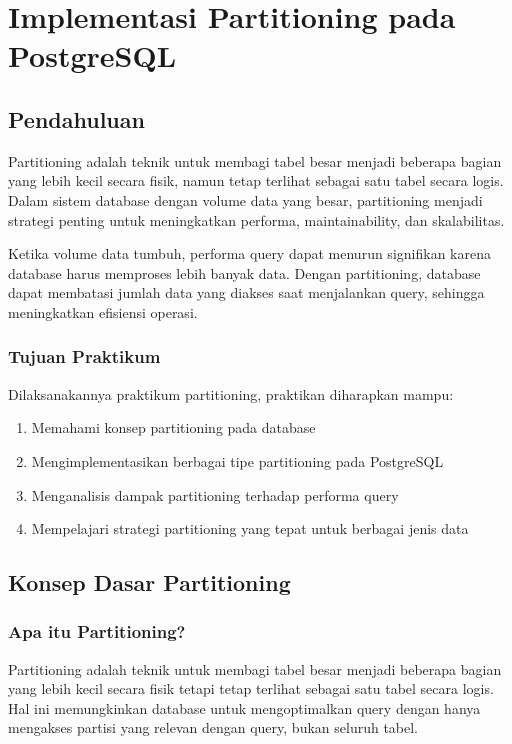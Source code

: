 \chapter{Implementasi Partitioning pada PostgreSQL}
\setcounter{section}{0}
\section{Pendahuluan}
Partitioning adalah teknik untuk membagi tabel besar menjadi beberapa bagian yang lebih kecil secara fisik, namun tetap terlihat sebagai satu tabel secara logis. Dalam sistem database dengan volume data yang besar, partitioning menjadi strategi penting untuk meningkatkan performa, maintainability, dan skalabilitas.

Ketika volume data tumbuh, performa query dapat menurun signifikan karena database harus memproses lebih banyak data. Dengan partitioning, database dapat membatasi jumlah data yang diakses saat menjalankan query, sehingga meningkatkan efisiensi operasi.

\subsection{Tujuan Praktikum}
Dilaksanakannya praktikum partitioning, praktikan diharapkan mampu:
\begin{enumerate}
    \item Memahami konsep partitioning pada database
    \item Mengimplementasikan berbagai tipe partitioning pada PostgreSQL
    \item Menganalisis dampak partitioning terhadap performa query
    \item Mempelajari strategi partitioning yang tepat untuk berbagai jenis data
\end{enumerate}

\section{Konsep Dasar Partitioning}

\subsection{Apa itu Partitioning?}
Partitioning adalah teknik untuk membagi tabel besar menjadi beberapa bagian yang lebih kecil secara fisik tetapi tetap terlihat sebagai satu tabel secara logis. Hal ini memungkinkan database untuk mengoptimalkan query dengan hanya mengakses partisi yang relevan dengan query, bukan seluruh tabel.

